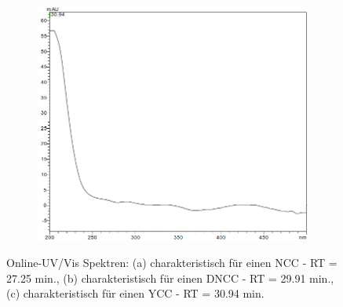\begin{figure}[!htbp]
  \begin{subfigure}[b]{0.5\textwidth}
    \includegraphics[width=\textwidth]{figures/Kapitel6/keineReaktion/YCC3094.png}
    \caption{}
    \label{fig:YCC3094}
  \end{subfigure}
  \caption[Online-UV/Vis Spektren mit der Charakteristik eines NCC bei 27.10 min., eines DNCC bei 29.75 min. sowie eines YCC bei 30.94 min., Quelle: Autor]{Online-UV/Vis Spektren: (a) charakteristisch für einen \gls{NCC} - RT = 27.25 min., (b) charakteristisch für einen \gls{DNCC} - RT = 29.91 min., (c) charakteristisch für einen \gls{YCC} - RT = 30.94 min.}
\end{figure}
